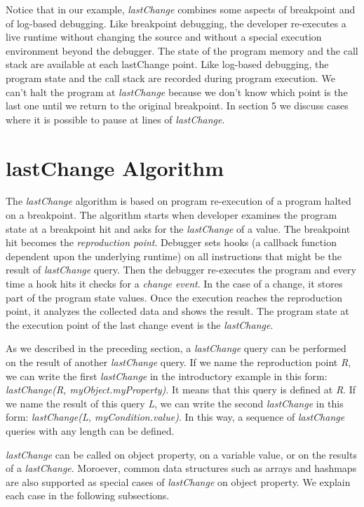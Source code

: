 \documentclass{sig-alternate}
\begin{document}
Notice that in our example, \textit{lastChange} combines some aspects
of breakpoint and of log-based debugging. Like breakpoint debugging,
the developer re-executes a live runtime without changing the source
and without a special execution environment beyond the debugger. The
state of the program memory and the call stack are available at each
lastChange point. Like log-based debugging, the program state and the
call stack are recorded during program execution. We can't halt the
program at \textit{lastChange} because we don't know which point is the last
one until we return to the original breakpoint. In section 5 we
discuss cases where it is possible to pause at lines of \textit{lastChange}.


\section{lastChange Algorithm}

The \textit{lastChange} algorithm is based on program re-execution of
a program halted on a breakpoint. The algorithm starts when developer
examines the program state at a breakpoint hit and asks for the
\textit{lastChange} of a value. The breakpoint hit becomes the
\textit{reproduction point}. Debugger sets hooks (a callback
function dependent upon the underlying runtime) on all instructions
that might be the result of \textit{lastChange} query. Then the
debugger re-executes the program and every time a hook hits it
checks for a \textit{change event}. In the case of a change, it stores
part of the program state values.  Once the execution reaches the
reproduction point, it analyzes the collected data and shows the
result.  The program state at the execution point of the last change
event is the \textit{lastChange}.


As we described in the preceding section, a \textit{lastChange} query can
be performed on the result of another \textit{lastChange} query. If we
name the reproduction point \textit{R}, we can write the first
\textit{lastChange} in the introductory example in this form:
\textit{lastChange(R, myObject.myProperty)}. It means that this query
is defined at \textit{R}. If we name the result of this query
\textit{L}, we can write the second \textit{lastChange} in this form:
\textit{lastChange(L, myCondition.value)}. In this way, a sequence of
\textit{lastChange} queries with any length can be defined. 

\textit{lastChange} can be called on object property, on a variable value, 
or on the results of a \textit{lastChange}. Moroever, common data structures such as
arrays and hashmaps are also supported as special cases of \textit{lastChange} on object property.
We explain each case in the following subsections.
\end{document}
